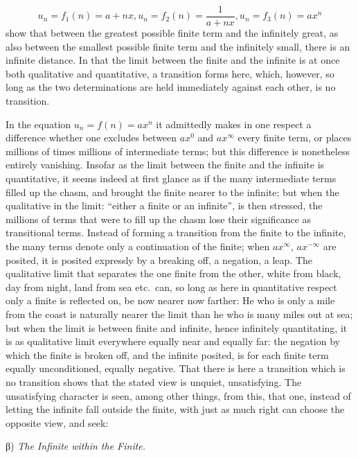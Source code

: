 \documentclass[12pt,a4paper,openany]{book}
\newcommand{\opage}[1]{\marginnote{\footnotesize\textit{[#1]}}}
\begin{document}
\[ u_{n}=f_{1}(n)=a+nx, u_{n}=f_{2}(n)=\frac{1}{a+nx}, u_{n}=f_{3}(n)=ax^{n} \]
show that between the greatest possible finite term and
the infinitely great, as also between the smallest possible
finite term and the infinitely small, there is an infinite distance.
In that the limit between the finite and the infinite is
at once both qualitative and quantitative, a transition forms
here, which, however, so long as the two determinations
are held immediately against each other, is no transition.

In the equation $u_{n}=f(n)=ax^{n}$ it admittedly makes in one respect
a difference whether one excludes between $ax^{0}$ and $ax^{\infty}$
every finite term, or places millions of times
millions of intermediate terms; but this difference is nonetheless
entirely vanishing. Insofar as the limit between the
finite and the infinite is quantitative, it seems indeed
at first glance as if the many intermediate terms filled up the
chasm, and brought the finite nearer to the
infinite; but when the qualitative in the limit:
``either a finite or an infinite'', is then stressed, the
millions of terms that were to fill up the chasm lose their significance
as transitional terms. Instead of forming a transition from
\setcounter{footnote}{0}%
\opage{31}the finite to the infinite, the many terms denote only
a continuation of the finite; when $ax^{\infty}$, $ax^{-\infty}$ are posited, it is posited expressly by a breaking off,
a negation, a leap. The qualitative limit that
separates the one finite from the other, white from black,
day from night, land from sea etc.\ can, so long as here in
quantitative respect only a finite is reflected on, be
now nearer now farther: He who is only a mile from the
coast is naturally nearer the limit than he who is
many miles out at sea; but when the limit is between
finite and infinite, hence infinitely quantitating, it is
as qualitative limit everywhere equally near and equally far:
the negation by which the finite is broken off, and the
infinite posited, is for each finite term equally unconditioned,
equally negative. That there is here a transition which is no transition
shows that the stated view is unquiet, unsatisfying.
The unsatisfying character is seen, among other things, from this, that
one, instead of letting the infinite fall outside the finite,
with just as much right can choose the opposite view,
and seek:

\begin{center}β) \emph{The Infinite within the Finite.}\end{center}
\end{document}
